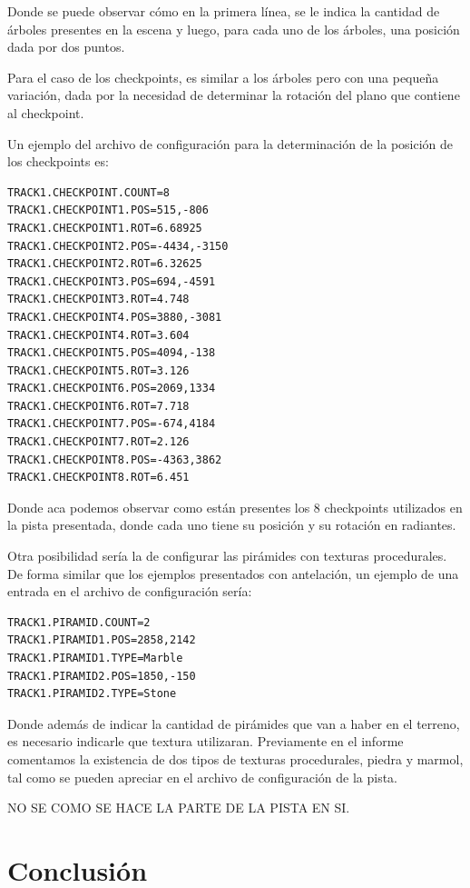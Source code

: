 \documentclass[a4paper,11pt]{article}
\begin{document}
Donde se puede observar cómo en la primera línea, se le indica la cantidad de
árboles presentes en la escena y luego, para cada uno de los árboles, una
posición dada por dos puntos.

Para el caso de los checkpoints, es similar a los árboles pero con una pequeña
variación, dada por la necesidad de determinar la rotación del plano que
contiene al checkpoint.

Un ejemplo del archivo de configuración para la determinación de la posición de
los checkpoints es:

\begin{verbatim}
TRACK1.CHECKPOINT.COUNT=8
TRACK1.CHECKPOINT1.POS=515,-806
TRACK1.CHECKPOINT1.ROT=6.68925
TRACK1.CHECKPOINT2.POS=-4434,-3150
TRACK1.CHECKPOINT2.ROT=6.32625
TRACK1.CHECKPOINT3.POS=694,-4591
TRACK1.CHECKPOINT3.ROT=4.748
TRACK1.CHECKPOINT4.POS=3880,-3081
TRACK1.CHECKPOINT4.ROT=3.604
TRACK1.CHECKPOINT5.POS=4094,-138
TRACK1.CHECKPOINT5.ROT=3.126
TRACK1.CHECKPOINT6.POS=2069,1334
TRACK1.CHECKPOINT6.ROT=7.718
TRACK1.CHECKPOINT7.POS=-674,4184
TRACK1.CHECKPOINT7.ROT=2.126
TRACK1.CHECKPOINT8.POS=-4363,3862
TRACK1.CHECKPOINT8.ROT=6.451
\end{verbatim}

Donde aca podemos observar como están presentes los 8 checkpoints utilizados en
la pista presentada, donde cada uno tiene su posición y su rotación en
radiantes.

Otra posibilidad sería la de configurar las pirámides con texturas
procedurales.  De forma similar que los ejemplos presentados con antelación, un
ejemplo de una entrada en el archivo de configuración sería:

\begin{verbatim}
TRACK1.PIRAMID.COUNT=2
TRACK1.PIRAMID1.POS=2858,2142
TRACK1.PIRAMID1.TYPE=Marble
TRACK1.PIRAMID2.POS=1850,-150
TRACK1.PIRAMID2.TYPE=Stone
\end{verbatim}

Donde además de indicar la cantidad de pirámides que van a haber en el terreno,
es necesario indicarle que textura utilizaran.  Previamente en el informe
comentamos la existencia de dos tipos de texturas procedurales, piedra y
marmol, tal como se pueden apreciar en el archivo de configuración de la pista.

NO SE COMO SE HACE LA PARTE DE LA PISTA EN SI.

\section{Conclusión}
\label{conclusiones}
\end{document}
